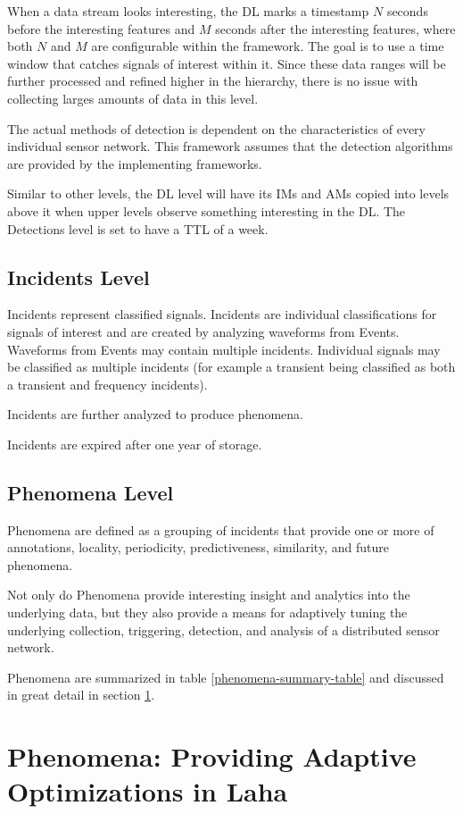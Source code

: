 When a data stream looks interesting, the DL marks a timestamp $N$ seconds before the interesting features and $M$ seconds after the interesting features, where both $N$ and $M$ are configurable within the framework. The goal is to use a time window that catches signals of interest within it. Since these data ranges will be further processed and refined higher in the hierarchy, there is no issue with collecting larges amounts of data in this level. 

The actual methods of detection is dependent on the characteristics of every individual sensor network. This framework assumes that the detection algorithms are provided by the implementing frameworks.

Similar to other levels, the DL level will have its IMs and AMs copied into levels above it when upper levels observe something interesting in the DL. The Detections level is set to have a TTL of a week.

\subsection{Incidents Level}
Incidents represent classified signals. Incidents are individual classifications for signals of interest and are created by analyzing waveforms from Events. Waveforms from Events may contain multiple incidents. Individual signals may be classified as multiple incidents (for example a transient being classified as both a transient and frequency incidents). 

Incidents are further analyzed to produce phenomena. 

Incidents are expired after one year of storage. 


\subsection{Phenomena Level}
Phenomena are defined as a grouping of incidents that provide one or more of annotations, locality, periodicity, predictiveness, similarity, and future phenomena. 

Not only do Phenomena provide interesting insight and analytics into the underlying data, but they also provide a means for adaptively tuning the underlying collection, triggering, detection, and analysis of a distributed sensor network.

Phenomena are summarized in table \ref{phenomena-summary-table} and discussed in great detail in section \ref{phenomena}.

\section{Phenomena: Providing Adaptive Optimizations in Laha} \label{phenomena}


